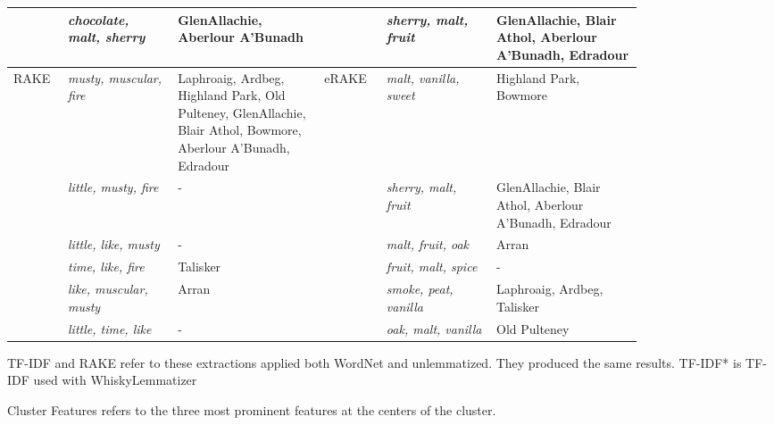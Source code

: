 \begin{threeparttable}
\begin{tabular}{p{0.05\linewidth} p{0.15\linewidth} p{0.2\linewidth}|p{0.07\linewidth} p{0.15\linewidth} p{0.2\linewidth}}
         & \textit{chocolate, malt, sherry} & GlenAllachie, Aberlour A'Bunadh                                                                                 &  & \textit{sherry, malt, fruit}  & GlenAllachie, Blair Athol, Aberlour A'Bunadh, Edradour  \\
    \midrule
    RAKE   & \textit{musty, muscular, fire}   & Laphroaig, Ardbeg, Highland Park, Old Pulteney, GlenAllachie, Blair Athol, Bowmore, Aberlour A'Bunadh, Edradour & eRAKE   & \textit{malt, vanilla, sweet} & Highland Park, Bowmore                                  \\
           & \textit{little, musty, fire}     & -                                                                                                               &    & \textit{sherry, malt, fruit}  & GlenAllachie, Blair Athol, Aberlour A'Bunadh, Edradour  \\
           & \textit{little, like, musty}     & -                                                                                                               &    & \textit{malt, fruit, oak}     & Arran                                                   \\
           & \textit{time, like, fire}        & Talisker                                                                                                        &    & \textit{fruit, malt, spice}   & -                                                       \\
           & \textit{like, muscular, musty}   & Arran                                                                                                           &    & \textit{smoke, peat, vanilla} & Laphroaig, Ardbeg, Talisker                             \\
           & \textit{little, time, like}      & -                                                                                                               &    & \textit{oak, malt, vanilla}   & Old Pulteney                                            \\
    \bottomrule
    \end{tabular}
    \begin{tablenotes}
        \small
        \item TF-IDF and RAKE refer to these extractions applied both WordNet and unlemmatized. They produced the same results. TF-IDF* is TF-IDF used with WhiskyLemmatizer
        \item Cluster Features refers to the three most prominent features at the centers of the cluster.
        \newline
    \end{tablenotes}
\end{threeparttable}


